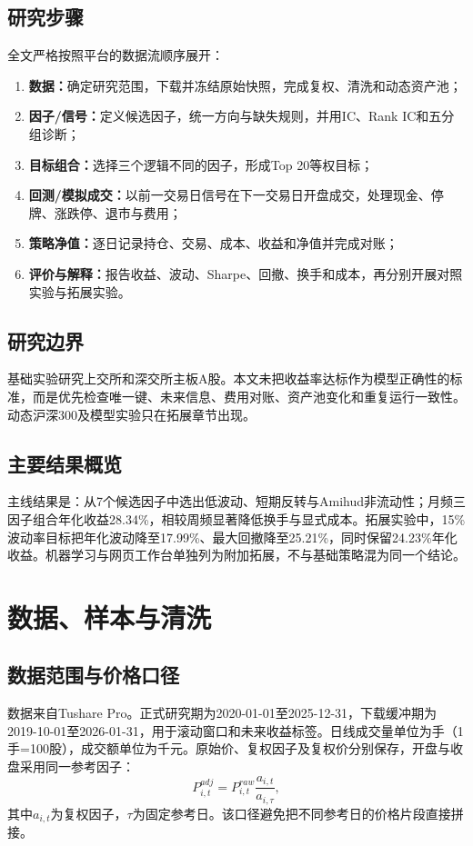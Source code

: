 \documentclass[10.5pt,a4paper]{ctexart}
\begin{document}
\subsection{研究步骤}
全文严格按照平台的数据流顺序展开：
\begin{enumerate}[nosep,leftmargin=2.2em]
\item \textbf{数据：}确定研究范围，下载并冻结原始快照，完成复权、清洗和动态资产池；
\item \textbf{因子/信号：}定义候选因子，统一方向与缺失规则，并用IC、Rank IC和五分组诊断；
\item \textbf{目标组合：}选择三个逻辑不同的因子，形成Top 20等权目标；
\item \textbf{回测/模拟成交：}以前一交易日信号在下一交易日开盘成交，处理现金、停牌、涨跌停、退市与费用；
\item \textbf{策略净值：}逐日记录持仓、交易、成本、收益和净值并完成对账；
\item \textbf{评价与解释：}报告收益、波动、Sharpe、回撤、换手和成本，再分别开展对照实验与拓展实验。
\end{enumerate}

\subsection{研究边界}
基础实验研究上交所和深交所主板A股。本文未把收益率达标作为模型正确性的标准，而是优先检查唯一键、未来信息、费用对账、资产池变化和重复运行一致性。动态沪深300及模型实验只在拓展章节出现。

\subsection{主要结果概览}
主线结果是：从7个候选因子中选出低波动、短期反转与Amihud非流动性；月频三因子组合年化收益28.34\%，相较周频显著降低换手与显式成本。拓展实验中，15\%波动率目标把年化波动降至17.99\%、最大回撤降至25.21\%，同时保留24.23\%年化收益。机器学习与网页工作台单独列为附加拓展，不与基础策略混为同一个结论。

\section{数据、样本与清洗}
\subsection{数据范围与价格口径}
数据来自Tushare Pro。正式研究期为2020-01-01至2025-12-31，下载缓冲期为2019-10-01至2026-01-31，用于滚动窗口和未来收益标签。日线成交量单位为手（1手=100股），成交额单位为千元。原始价、复权因子及复权价分别保存，开盘与收盘采用同一参考因子：
\[
P^{adj}_{i,t}=P^{raw}_{i,t}\frac{a_{i,t}}{a_{i,\tau}},
\]
其中$a_{i,t}$为复权因子，$\tau$为固定参考日。该口径避免把不同参考日的价格片段直接拼接。
\end{document}
